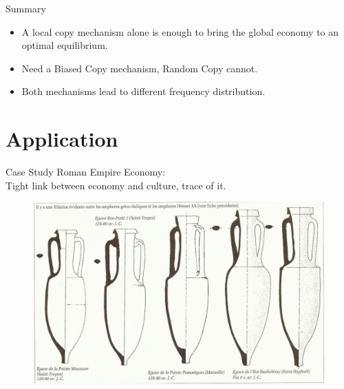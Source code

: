 \documentclass[12pt, handout=show,notes=show]{beamer}
\begin{document}
\begin{frame}{Summary}
\begin{itemize}
	\item A local copy mechanism alone is enough to bring the global economy to an optimal equilibrium.
		\vfill
	\item Need a Biased Copy mechanism, Random Copy cannot.
		\vfill
	\item Both mechanisms lead to different frequency distribution.
		\vfill
\end{itemize}

\end{frame}

\section{Application}
\begin{frame}{Case Study}
	Roman Empire Economy: \\
	Tight link between economy and culture, trace of it. \\
	\begin{figure}
		\includegraphics[width=.6\textwidth]{images/dressel-filiation.jpg}
	\end{figure}
	
\end{frame}
\end{document}
